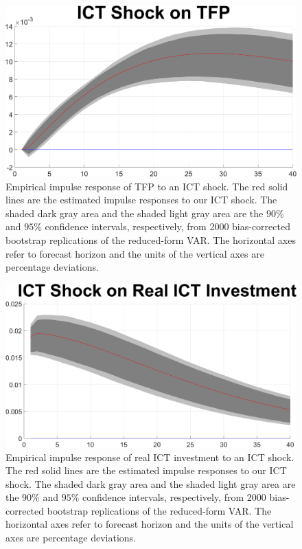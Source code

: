 \documentclass[12pt]{article}
\begin{document}
	\begin{figure}[h!]
		\begin{center}
\includegraphics[scale=0.35]{MainFigures/fig_ICT_Shock_on_TFP_empirical_noH}
		\caption{Empirical impulse response of TFP to an ICT shock. The red solid lines are the estimated impulse responses to our ICT shock. The shaded dark gray area and the shaded light gray area are the $90$\% and $95$\% confidence intervals, respectively, from 2000 bias-corrected bootstrap replications of the reduced-form VAR. The horizontal axes refer to forecast horizon and the units of the vertical axes are percentage deviations.}
		\label{fig:TFP_main}
	\end{center}
\end{figure}

\newpage




	\begin{figure}[h!]
		\begin{center}
		\includegraphics[scale=0.35]{MainFigures/fig_ICT_Shock_on_Real_ICT_Investment_empirical_noH}
		\caption{Empirical impulse response of real ICT investment to an ICT shock. The red solid lines are the estimated impulse responses to our ICT shock. The shaded dark gray area and the shaded light gray area are the $90$\% and $95$\% confidence intervals, respectively, from 2000 bias-corrected bootstrap replications of the reduced-form VAR. The horizontal axes refer to forecast horizon and the units of the vertical axes are percentage deviations.}
		\label{fig:ICT_main}
	\end{center} 
	\end{figure}
\end{document}
